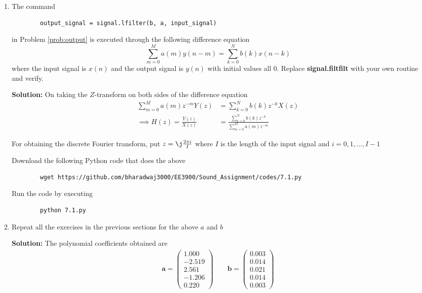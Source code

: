 \documentclass[journal,12pt,twocolumn]{IEEEtran}
\newcommand{\solution}{\noindent \textbf{Solution: }}
\providecommand{\brak}[1]{\ensuremath{\left(#1\right)}}
\let\vec\mathbf
\numberwithin{equation}{section}
\renewcommand\thesection{\arabic{section}}
\newcommand{\myvec}[1]{\ensuremath{\begin{pmatrix}#1\end{pmatrix}}}
\begin{document}
	\begin{enumerate}[label=\thesection.\arabic*]
	\item The command
	\begin{lstlisting}
		output_signal = signal.lfilter(b, a, input_signal)
	\end{lstlisting}
	in Problem \ref{prob:output} is executed through the following difference equation
	\begin{equation}
		\label{eq:iir_filter_gen}
 		\sum _{m=0}^{M}a\brak{m}y\brak{n-m}=\sum _{k=0}^{N}b\brak{k}x\brak{n-k}
	\end{equation}
	where the input signal is $x(n)$ and the output signal is $y(n)$ with initial values all 0. Replace \textbf{signal.filtfilt} with your own routine and verify.
	
	\solution On taking the $Z$-transform on both sides of the difference equation
	\begin{align}
		\sum _{m=0}^{M}a\brak{m} z^{-m} Y(z) &= \sum _{k=0}^{N}b\brak{k} z^{-k} X(z) \\
		\implies H(z) = \frac{Y(z)}{X(z)} &= \frac{\sum _{k=0}^{N}b\brak{k} z^{-k}}{\sum _{m=0}^{M}a\brak{m} z^{-m}}
	\end{align}
	
	For obtaining the discrete Fourier transform, put $z = \j \frac{2\pi i}{I}$ where $I$ is the length of the input signal and $i = 0, 1, \ldots, I-1$
	
	Download the following Python code that does the above
	\begin{lstlisting}
		wget https://github.com/bharadwaj3000/EE3900/Sound_Assignment/codes/7.1.py
	\end{lstlisting}
	
	Run the code by executing
	\begin{lstlisting}
		python 7.1.py
	\end{lstlisting}
	
	\item Repeat all the exercises in the previous sections for the above $a$ and $b$
	
	\solution The polynomial coefficients obtained are
	\begin{align}
		\vec{a} = \myvec{1.000 \\ -2.519 \\ 2.561 \\ -1.206 \\ 0.220} \qquad
		\vec{b} = \myvec{0.003 \\ 0.014 \\ 0.021 \\ 0.014 \\ 0.003}
	\end{align}
	

\end{enumerate}
\end{document}
